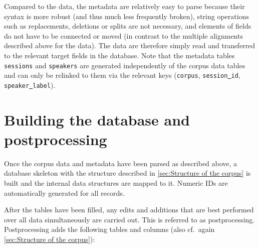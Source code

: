 \documentclass[a4paper, 11pt]{book}
\newcommand{\und}{\underline{{ }}\hspace{0.2mm}}	%
\begin{document}
Compared to the data, the metadata are relatively easy to parse because their syntax is more robust (and thus much less frequently broken), string operations such as replacements, deletions or splits are not necessary, and elements of fields do not have to be connected or moved (in contrast to the multiple alignments described above for the data). The data are therefore simply read and transferred to the relevant target fields in the database. Note that the metadata tables \texttt{sessions} and \texttt{speakers} are generated independently of the corpus data tables and can only be relinked to them via the relevant keys (\texttt{corpus}, \texttt{session\und id}, \texttt{speaker\und label}). 


\section{Building the database and postprocessing}
\label{sec:Building the database and postprocessing}

Once the corpus data and metadata have been parsed as described above, a database skeleton with the structure described in \autoref{sec:Structure of the corpus} is built and the internal data structures are mapped to it. Numeric IDs are automatically generated for all records. 

After the tables have been filled, any edits and additions that are best performed over all data simultaneously are carried out. This is referred to as postprocessing. Postprocessing adds the following tables and columns (also cf.\ again \autoref{sec:Structure of the corpus}): 
\end{document}

